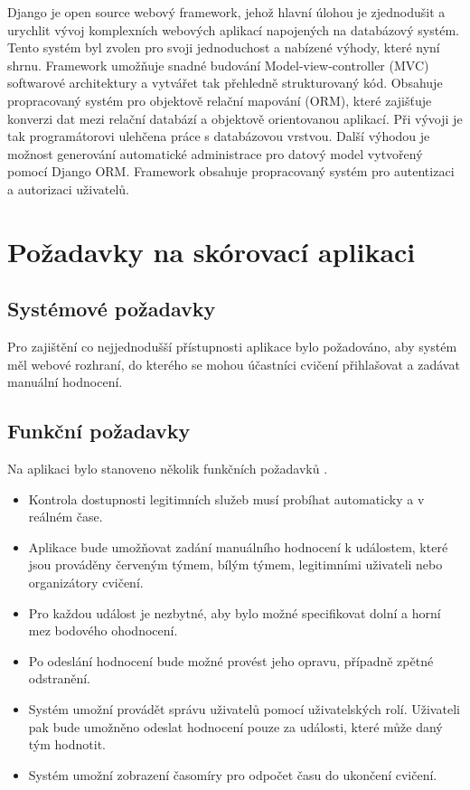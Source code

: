 \documentclass[
  digital, %
  twoside, %
  table,   %
  lof,     %
  lot,     %
]{fithesis3}
\begin{document}
Django je open source webový framework, jehož hlavní úlohou je zjednodušit a urychlit vývoj komplexních webových aplikací napojených na databázový systém. Tento systém byl zvolen pro svoji jednoduchost a nabízené výhody, které nyní shrnu. Framework umožňuje snadné budování Model-view-controller (MVC) softwarové architektury a vytvářet tak přehledně strukturovaný kód. Obsahuje propracovaný systém pro objektově relační mapování (ORM), které zajišťuje konverzi dat mezi relační databází a objektově orientovanou aplikací. Při vývoji je tak programátorovi ulehčena práce s databázovou vrstvou. Další výhodou je možnost generování automatické administrace pro datový model vytvořený pomocí Django ORM. Framework obsahuje propracovaný systém pro autentizaci a autorizaci uživatelů. 

\section{Požadavky na skórovací aplikaci}

\subsection{Systémové požadavky}
Pro zajištění co nejjednodušší přístupnosti aplikace bylo požadováno, aby systém měl webové rozhraní, do kterého se mohou účastníci cvičení přihlašovat a zadávat manuální hodnocení.

\subsection{Funkční požadavky}
Na aplikaci bylo stanoveno několik funkčních požadavků \cite{Kostelnik2016thesis}.
\begin{itemize}
\item Kontrola dostupnosti legitimních služeb musí probíhat automaticky a v reálném čase.
\item Aplikace bude umožňovat zadání manuálního hodnocení k událostem, které jsou prováděny červeným týmem, bílým týmem, legitimními uživateli nebo organizátory cvičení.
\item Pro každou událost je nezbytné, aby bylo možné specifikovat dolní a horní mez bodového ohodnocení.
\item Po odeslání hodnocení bude možné provést jeho opravu, případně zpětné odstranění.
\item Systém umožní provádět správu uživatelů pomocí uživatelských rolí. Uživateli pak bude umožněno odeslat hodnocení pouze za události, které může daný tým hodnotit.
\item Systém umožní zobrazení časomíry pro odpočet času do ukončení cvičení.
\end{itemize}
\end{document}
